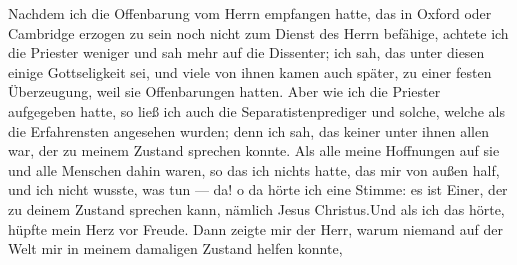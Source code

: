 Nachdem ich die Offenbarung vom Herrn empfangen hatte,
\glqq das in Oxford oder Cambridge erzogen zu sein noch nicht zum
Dienst des Herrn befähige\grqq, achtete ich die Priester weniger und
sah mehr auf die Dissenter; ich sah, das unter diesen einige
Gottseligkeit sei, und viele von ihnen kamen auch später, zu einer
festen Überzeugung, weil sie Offenbarungen hatten. Aber wie
ich die Priester aufgegeben hatte, so ließ ich auch die 
Separatistenprediger und solche, welche als die Erfahrensten angesehen
wurden; denn ich sah, das keiner unter ihnen allen war, der zu meinem
Zustand sprechen konnte. Als alle meine Hoffnungen auf sie und alle
Menschen dahin waren, so das ich nichts hatte, das mir von außen
half, und ich nicht wusste, was tun — da! o da hörte ich eine
Stimme: \glqq es ist Einer, der zu deinem Zustand sprechen kann,
nämlich Jesus Christus.\grqq Und als ich das hörte, hüpfte mein
Herz vor Freude. Dann zeigte mir der Herr, warum niemand
auf der Welt mir in meinem damaligen Zustand helfen konnte,

